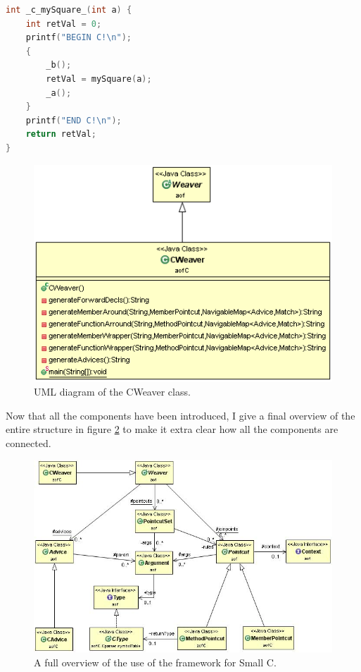 \documentclass[a4paper]{report}
\begin{document}
\begin{lstlisting}[language=C, caption=A generated method for an around advice with advice nested within., label=lst:SmallC_ComplexAround]
int _c_mySquare_(int a) {
	int retVal = 0;
	printf("BEGIN C!\n");
	{
		_b();
		retVal = mySquare(a);
		_a();
	}
	printf("END C!\n");
	return retVal;
}
\end{lstlisting}
\begin{figure}
\centering
\includegraphics[scale=0.7]{images/AOFC/CWeaver.png}
\caption{UML diagram of the CWeaver class.}
\label{fig:CWeaver}
\end{figure}
Now that all the components have been introduced, I give a final overview of the entire structure in figure \ref{fig:CFull} to make it extra clear how all the components are connected.
\begin{figure}[h!]
\centering
\includegraphics[scale=0.55]{images/AOFC/CFull.jpg}
\caption{A full overview of the use of the framework for Small C.}
\label{fig:CFull}
\end{figure}
\end{document}
